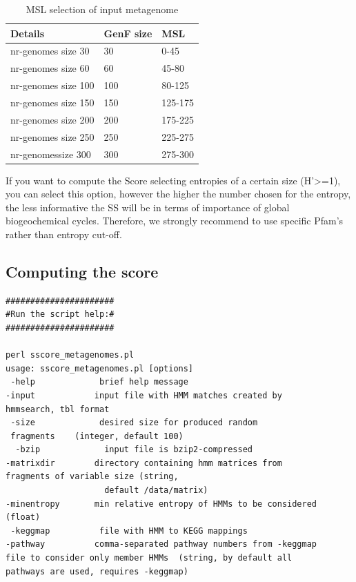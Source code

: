 \documentclass[a4paper,11pt]{report}
\begin{document}
\begin{table}[H]
\centering
\caption{MSL selection of input metagenome}
\label{MSL-input}
\begin{tabular}{@{}lll@{}}
\toprule
Details             & GenF size & MSL     \\ \midrule
nr-genomes size 30  & 30        & 0-45    \\
nr-genomes size 60  & 60        & 45-80   \\
nr-genomes size 100 & 100       & 80-125  \\
nr-genomes size 150 & 150       & 125-175 \\
nr-genomes size 200 & 200       & 175-225 \\
nr-genomes size 250 & 250       & 225-275 \\
nr-genomessize 300  & 300       & 275-300 \\ \bottomrule
\end{tabular}
\end{table}

If you want to compute the Score selecting entropies of a certain 
size (H'>=1), you can select this 
option, however  the higher the number chosen for the entropy,  
the less informative the SS will be in terms of importance of 
global biogeochemical cycles. Therefore, we strongly recommend to 
use specific Pfam's rather than entropy cut-off. 

\subsection{Computing the score}
\label{entropy_score}
\begin{verbatim}
######################
#Run the script help:#
######################

perl sscore_metagenomes.pl
usage: sscore_metagenomes.pl [options] 
 -help             brief help message
-input            input file with HMM matches created by 
hmmsearch, tbl format
 -size             desired size for produced random 
 fragments    (integer, default 100)
  -bzip             input file is bzip2-compressed
-matrixdir        directory containing hmm matrices from 
fragments of variable size (string, 
                    default /data/matrix)
-minentropy       min relative entropy of HMMs to be considered (float)
 -keggmap          file with HMM to KEGG mappings
-pathway          comma-separated pathway numbers from -keggmap 
file to consider only member HMMs  (string, by default all 
pathways are used, requires -keggmap)
\end{verbatim}
\end{document}
